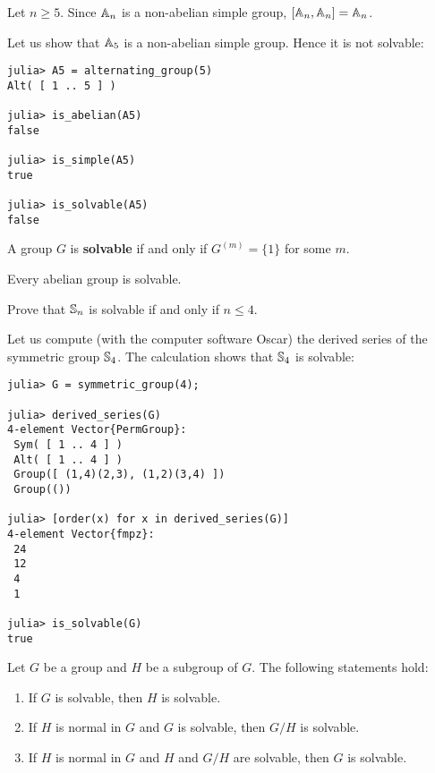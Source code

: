 \begin{example}
    Let $n\geq5$. Since $\mathbb{A}_n$ is a non-abelian simple group, 
    $[\mathbb{A}_n,\mathbb{A}_n]=\mathbb{A}_n$. 
\end{example}

Let us show that $\mathbb{A}_5$ is a non-abelian simple group. Hence
it is not solvable: 
\begin{lstlisting}
julia> A5 = alternating_group(5)
Alt( [ 1 .. 5 ] )

julia> is_abelian(A5)
false

julia> is_simple(A5)
true

julia> is_solvable(A5)
false
\end{lstlisting}

\begin{definition}
    A group $G$ is \textbf{solvable} if and only if
    $G^{(m)}=\{1\}$ for some $m$. 
\end{definition}

Every abelian group is solvable. 

\begin{exercise}
    Prove that $\mathbb{S}_n$ is solvable if and only if $n\leq4$. 
\end{exercise}

Let us compute (with the computer software Oscar) 
the derived series of the symmetric group
$\mathbb{S}_4$. The calculation shows that $\mathbb{S}_4$ is solvable: 
\begin{lstlisting}
julia> G = symmetric_group(4);

julia> derived_series(G)
4-element Vector{PermGroup}:
 Sym( [ 1 .. 4 ] )
 Alt( [ 1 .. 4 ] )
 Group([ (1,4)(2,3), (1,2)(3,4) ])
 Group(())
 
julia> [order(x) for x in derived_series(G)]
4-element Vector{fmpz}:
 24
 12
 4
 1
 
julia> is_solvable(G)
true
\end{lstlisting}

\begin{proposition}
\label{pro:solvable}
    Let $G$ be a group and $H$ be a subgroup of $G$. 
    The following statements hold:
    \begin{enumerate}
        \item If $G$ is solvable, then $H$ is solvable.
        \item If $H$ is normal in $G$ and $G$ is solvable, then $G/H$ is solvable. 
        \item If $H$ is normal in $G$ and $H$ and $G/H$ are solvable, then $G$ is solvable. 
    \end{enumerate}
\end{proposition}

